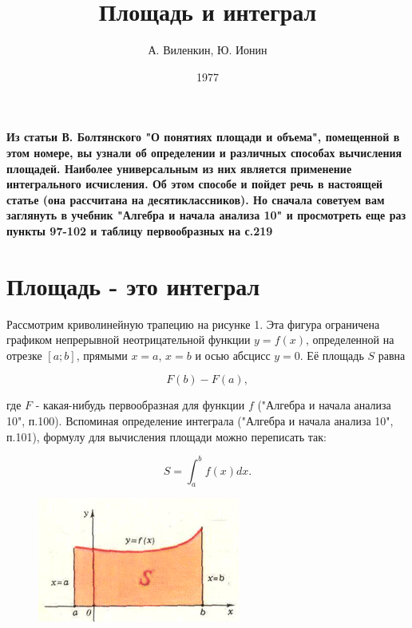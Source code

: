 

\author{А. Виленкин, Ю. Ионин}
\title{Площадь и интеграл}
\date{1977}


% 
\maketitle
\begin{multicols}{2}
{\small\textbf{Из статьи В. Болтянского "О понятиях площади и объема", помещенной в этом номере, вы узнали
    об определении и различных способах вычисления площадей. Наиболее универсальным из них является применение интегрального исчисления. Об этом способе и пойдет речь в настоящей статье (она рассчитана на десятиклассников). Но сначала советуем вам заглянуть в учебник "Алгебра и начала анализа 10" и просмотреть еще раз пункты 97-102 и таблицу первообразных на с.219}}

\section{Площадь - это интеграл}
Рассмотрим криволинейную трапецию на рисунке 1. Эта фигура ограничена графиком непрерывной неотрицательной функции $y=f(x)$, определенной на отрезке $[a;b]$, прямыми $x=a$, $x=b$ и осью абсцисс $y=0$. Её площадь $S$ равна

\[F(b)-F(a),\]

где $F$ - какая-нибудь первообразная для функции $f$ ("Алгебра и начала анализа 10", п.100). Вспоминая определение интеграла ("Алгебра и начала анализа 10", п.101), формулу для вычисления площади можно переписать так:

\begin{equation}
    \label{eq:1}S=\int_a^bf(x)dx.
\end{equation}

\begin{figure}[H]
    \centering
    \includegraphics{img1.png}
    \label{fig:img1}
\end{figure}


\end{multicols}
